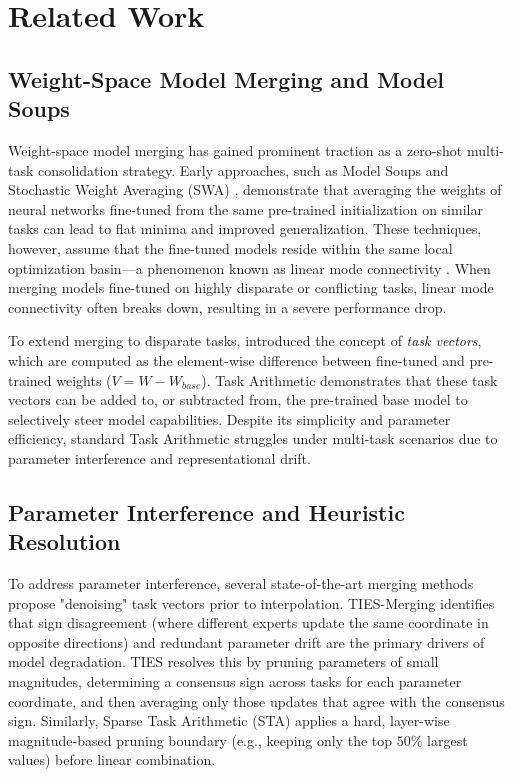 \section{Related Work}
\label{sec:related}

\subsection{Weight-Space Model Merging and Model Soups}
Weight-space model merging has gained prominent traction as a zero-shot multi-task consolidation strategy. Early approaches, such as Model Soups \cite{wortsman2022model} and Stochastic Weight Averaging (SWA) \cite{izmailov2018averaging}, demonstrate that averaging the weights of neural networks fine-tuned from the same pre-trained initialization on similar tasks can lead to flat minima and improved generalization. These techniques, however, assume that the fine-tuned models reside within the same local optimization basin—a phenomenon known as linear mode connectivity \cite{frankle2020linear}. When merging models fine-tuned on highly disparate or conflicting tasks, linear mode connectivity often breaks down, resulting in a severe performance drop.

To extend merging to disparate tasks, \citet{ilharco2022editing} introduced the concept of \emph{task vectors}, which are computed as the element-wise difference between fine-tuned and pre-trained weights ($V = W - W_{base}$). Task Arithmetic demonstrates that these task vectors can be added to, or subtracted from, the pre-trained base model to selectively steer model capabilities. Despite its simplicity and parameter efficiency, standard Task Arithmetic struggles under multi-task scenarios due to parameter interference and representational drift.

\subsection{Parameter Interference and Heuristic Resolution}
To address parameter interference, several state-of-the-art merging methods propose "denoising" task vectors prior to interpolation. TIES-Merging \cite{yadav2023ties} identifies that sign disagreement (where different experts update the same coordinate in opposite directions) and redundant parameter drift are the primary drivers of model degradation. TIES resolves this by pruning parameters of small magnitudes, determining a consensus sign across tasks for each parameter coordinate, and then averaging only those updates that agree with the consensus sign. Similarly, Sparse Task Arithmetic (STA) \cite{polymerge, zipmerge} applies a hard, layer-wise magnitude-based pruning boundary (e.g., keeping only the top $50\%$ largest values) before linear combination. 

